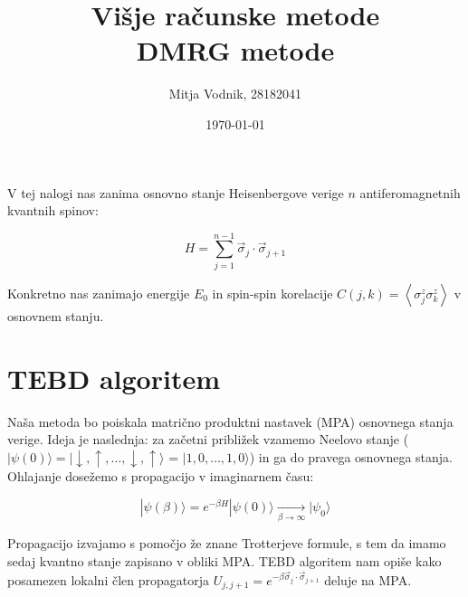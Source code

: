 \documentclass[a4paper]{article}
\newcommand{\ket}[1]{|#1\rangle}
\newcommand{\s}{\sigma}
\newcommand{\vs}{\vec{\s}}
\newcommand{\expected}[1]{\left\langle #1 \right\rangle}
\newcommand{\up}{\uparrow}
\newcommand{\down}{\downarrow}
\begin{document}
    \title{\sc\large Višje računske metode\\
		\bigskip
		\bf\Large DMRG metode}
	\author{Mitja Vodnik, 28182041}
            \date{\today}
	\maketitle

    V tej nalogi nas zanima osnovno stanje Heisenbergove verige $n$ antiferomagnetnih kvantnih spinov:

    \begin{equation}\label{eq1}
        H = \sum_{j=1}^{n-1} \vs_j \cdot \vs_{j+1}
    \end{equation}

    Konkretno nas zanimajo energije $E_0$ in spin-spin korelacije $C(j, k) = \expected{\s^z_j\s^z_k}$ v osnovnem stanju.

    \section{TEBD algoritem}

    Naša metoda bo poiskala matrično produktni nastavek (MPA) osnovnega stanja verige. Ideja je naslednja: za začetni približek vzamemo Neelovo
    stanje ($\ket{\psi(0)} = \ket{\down, \up, \ldots, \down, \up}$ = $\ket{1, 0, \ldots, 1, 0}$) in ga  do pravega osnovnega
    stanja.
    Ohlajanje dosežemo s propagacijo v imaginarnem času:

    \begin{equation}\label{eq2}
        \ket{\psi(\beta)} = e^{-\beta H} \ket{\psi(0)} \xrightarrow[\beta \to \infty]{} \ket{\psi_0}
    \end{equation}

    Propagacijo izvajamo s pomočjo že znane Trotterjeve formule, s tem da imamo sedaj kvantno stanje zapisano v obliki MPA. TEBD algoritem nam opiše
    kako posamezen lokalni člen propagatorja $U_{j, j+1} = e^{-\beta \vs_j \cdot \vs_{j+1}}$ deluje na MPA.

    \iffalse
    \begin{figure}
        \centering
        \texttt{[image: slika1.pdf]}
        \caption{Odvisnost entropije prepletenosti simetrične biparticije osnovnega stanja od dolžine verige. Dolžine verig na tem grafu so le sode.}
        \label{slika1}
    \end{figure}

    \begin{figure}
        \centering
        \begin{subfigure}{\textwidth}
            \texttt{[image: slika4a.pdf]}
        \end{subfigure}
        \begin{subfigure}{\textwidth}
            \texttt{[image: slika4b.pdf]}
        \end{subfigure}
        \caption{Odvisnost entropije prepletenosti od velikosti blokov biparticije osnovnega stanja s periodičnimi robnimi pogoji.}
        \label{slika4}
    \end{figure}
    \fi
\end{document}
